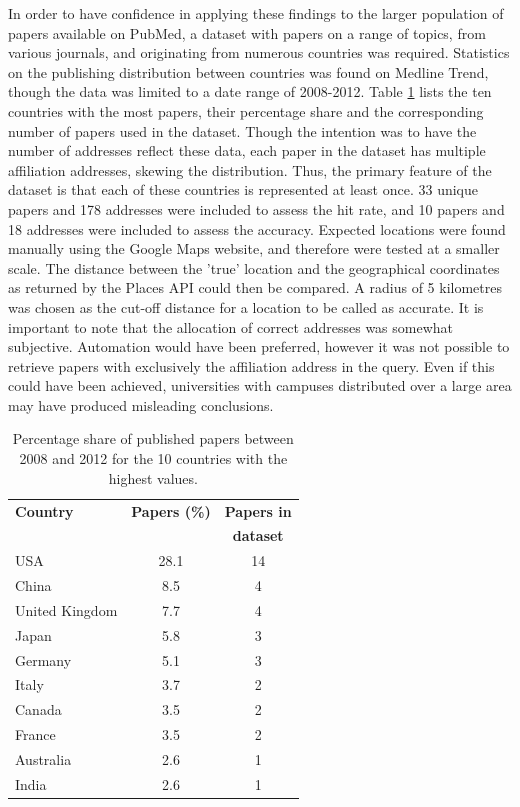 \documentclass[Report.tex]{subfiles}
\begin{document}
\noindent In order to have confidence in applying these findings to the larger population of papers available on PubMed, a dataset with papers on a range of topics, from various journals, and originating from numerous countries was required. Statistics on the publishing distribution between countries was found on Medline Trend\cite{medlinetrend}, though the data was limited to a date range of 2008-2012. Table \ref{tab:countries} lists the ten countries with the most papers, their percentage share and the corresponding number of papers used in the dataset. Though the intention was to have the number of addresses reflect these data, each paper in the dataset has multiple affiliation addresses, skewing the distribution. Thus, the primary feature of the dataset is that each of these countries is represented at least once. 33 unique papers and 178 addresses were included to assess the hit rate, and 10 papers and 18 addresses were included to assess the accuracy. Expected locations were found manually using the Google Maps website, and therefore were tested at a smaller scale. The distance between the 'true' location and the geographical coordinates as returned by the Places API could then be compared. A radius of 5 kilometres was chosen as the cut-off distance for a location to be called as accurate. It is important to note that the allocation of correct addresses was somewhat subjective. Automation would have been preferred, however it was not possible to retrieve papers with exclusively the affiliation address in the query. Even if this could have been achieved, universities with campuses distributed over a large area may have produced misleading conclusions.\newpage

\begin{table}
\begin{center}
    \begin{tabular}{ | l | c | c | }\hline
    \textbf{Country} & \textbf{Papers (\%)} & \textbf{Papers in} \\
     & &\textbf{dataset}\\ \hline
    USA & 28.1 & 14\\ \hline
    China & 8.5 & 4\\ \hline
    United Kingdom & 7.7 & 4\\ \hline
    Japan & 5.8 & 3\\ \hline
    Germany & 5.1 & 3\\ \hline
    Italy & 3.7 & 2\\ \hline
    Canada & 3.5 & 2\\ \hline
    France & 3.5 & 2\\ \hline
    Australia & 2.6 & 1\\ \hline
    India & 2.6 & 1\\ \hline
    \end{tabular}
    \caption{Percentage share of published papers between 2008 and 2012 for the 10 countries with the highest values.\label{tab:countries}}
\end{center}
\end{table}
\end{document}
